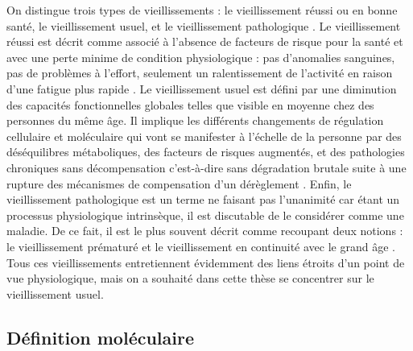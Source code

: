 On distingue trois types de vieillissements : le vieillissement réussi ou en bonne santé, le vieillissement usuel, et le vieillissement pathologique \cite{vanBuchem2004Dec}. Le vieillissement réussi est décrit comme associé à l'absence de facteurs de risque pour la santé et avec une perte minime de condition physiologique : pas d'anomalies sanguines, pas de problèmes à l'effort, seulement un ralentissement de l'activité en raison d'une fatigue plus rapide \cite{Berrut2013}. Le vieillissement usuel est défini par une diminution des capacités fonctionnelles globales telles que visible en moyenne chez des personnes du même âge. Il implique les différents changements de régulation cellulaire et moléculaire qui vont se manifester à l'échelle de la personne par des déséquilibres métaboliques, des facteurs de risques augmentés, et des pathologies chroniques sans décompensation c’est-à-dire sans dégradation brutale suite à une rupture des mécanismes de compensation d'un dérèglement \cite{Berrut2013}. Enfin, le vieillissement pathologique est un terme ne faisant pas l'unanimité car étant un processus physiologique intrinsèque, il est discutable de le considérer comme une maladie. De ce fait, il est le plus souvent décrit comme recoupant deux notions : le vieillissement prématuré et le vieillissement en continuité avec le grand âge \cite{Belmin2014}. Tous ces vieillissements entretiennent évidemment des liens étroits d'un point de vue physiologique, mais on a souhaité dans cette thèse se concentrer sur le vieillissement usuel.


\subsection{Définition moléculaire}

